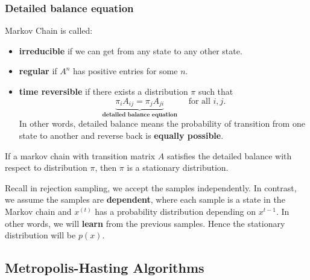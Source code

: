 \subsubsection*{Detailed balance equation}
Markov Chain is called:
\begin{itemize}
    \item \textbf{irreducible} if we can get from any state to any other state.
    \item \textbf{regular} if $A^n$ has positive entries for some $n$.
    \item \textbf{time reversible} if there exists a distribution $\pi$ such that
    $$
    \underbrace{\pi_i A_{i j}=\pi_j A_{j i}}_{\textbf{detailed balance equation}} \quad \text { for all } i, j .
    $$
    In other words, detailed balance means the probability of transition from one state to another and reverse back is \textbf{equally possible}.
\end{itemize}
\begin{theorem}
    If a markov chain with transition matrix $A$ satisfies the detailed balance with respect to distribution $\pi$, then $\pi$ is a stationary distribution.
\end{theorem}
Recall in rejection sampling, we accept the samples independently. In contrast, we assume the samples are \textbf{dependent}, where each sample is a state in the Markov chain and $x^{(t)}$ has a probability distribution depending on $x^{t-1}$. In other words, we will \textbf{learn} from the previous samples. Hence the stationary distribution will be $p(x)$.\\

\subsection{Metropolis-Hasting Algorithms}

